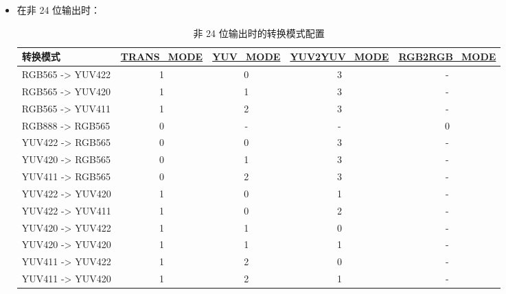 \documentclass[main\_\_CN.tex]{subfiles}
\begin{document}
\begin{enumerate}
\begin{itemize}
\begin{table}[H]
\begin{threeparttable}
\begin{tablenotes}
            \end{tablenotes}
            \end{threeparttable}
            \end{table}
        \item 在非 24 位输出时：
                      \begin{table}[H]
                \caption{非 24 位输出时的转换模式配置}
                \centering
                \begin{threeparttable}
                \begin{tabular}{|l|c|c|c|c|}
                \hline
                \rowcolor{lightgray}
                \textbf{转换模式} & \textbf{\hyperref[fielddesc:LCDCAMLCDCONVTRANSMODE]{TRANS\_MODE}}\tnote{1} & \textbf{\hyperref[fielddesc:LCDCAMLCDCONVYUVMODE]{YUV\_MODE}}\tnote{2} & \textbf{\hyperref[fielddesc:LCDCAMLCDCONVYUV2YUVMODE]{YUV2YUV\_MODE}}\tnote{3} &
                \textbf{\hyperref[fielddesc:LCDCAMLCDCONVRGB2RGBMODE]{RGB2RGB\_MODE}}\tnote{4} \\ \hline            
                RGB565 -> YUV422 & 1 & 0 & 3 & - \\ \hline
                RGB565 -> YUV420 & 1 & 1 & 3 & - \\ \hline
                RGB565 -> YUV411 & 1 & 2 & 3 & - \\ \hline
                RGB888 -> RGB565 & 0 & - & - & 0 \\ \hline
                YUV422 -> RGB565 & 0 & 0 & 3 & - \\ \hline
                YUV420 -> RGB565 & 0 & 1 & 3 & - \\ \hline
                YUV411 -> RGB565 & 0 & 2 & 3 & - \\ \hline
                YUV422 -> YUV420 & 1 & 0 & 1 & - \\ \hline
                YUV422 -> YUV411 & 1 & 0 & 2 & - \\ \hline
                YUV420 -> YUV422 & 1 & 1 & 0 & - \\ \hline
                YUV420 -> YUV420 & 1 & 1 & 1 & - \\ \hline
                YUV411 -> YUV422 & 1 & 2 & 0 & - \\ \hline
                YUV411 -> YUV420 & 1 & 2 & 1 & - \\ \hline
                \end{tabular}
            

\end{threeparttable}
\end{table}
\end{itemize}
\end{enumerate}
\end{document}

